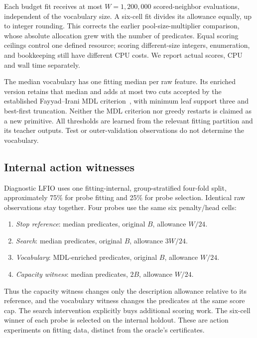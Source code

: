 \documentclass[review,12pt]{elsarticle}
\begin{document}
Each budget fit receives at most $W=1{,}200{,}000$ scored-neighbor evaluations, independent of the vocabulary size. A six-cell fit divides its allowance equally, up to integer rounding. This corrects the earlier pool-size-multiplier comparison, whose absolute allocation grew with the number of predicates. Equal scoring ceilings control one defined resource; scoring different-size integers, enumeration, and bookkeeping still have different CPU costs. We report actual scores, CPU and wall time separately.

The median vocabulary has one fitting median per raw feature. Its enriched version retains that median and adds at most two cuts accepted by the established Fayyad--Irani MDL criterion~\citep{fayyad1993}, with minimum leaf support three and best-first truncation. Neither the MDL criterion nor greedy restarts is claimed as a new primitive. All thresholds are learned from the relevant fitting partition and its teacher outputs. Test or outer-validation observations do not determine the vocabulary.

\subsection{Internal action witnesses}
Diagnostic LFIO uses one fitting-internal, group-stratified four-fold split, approximately 75\% for probe fitting and 25\% for probe selection. Identical raw observations stay together. Four probes use the same six penalty/head cells:
\begin{enumerate}[leftmargin=*,itemsep=2pt]
\item \emph{Stop reference}: median predicates, original $B$, allowance $W/24$.
\item \emph{Search}: median predicates, original $B$, allowance $3W/24$.
\item \emph{Vocabulary}: MDL-enriched predicates, original $B$, allowance $W/24$.
\item \emph{Capacity witness}: median predicates, $2B$, allowance $W/24$.
\end{enumerate}
Thus the capacity witness changes only the description allowance relative to its reference, and the vocabulary witness changes the predicates at the same score cap. The search intervention explicitly buys additional scoring work. The six-cell winner of each probe is selected on the internal holdout. These are action experiments on fitting data, distinct from the oracle's certificates.
\end{document}
